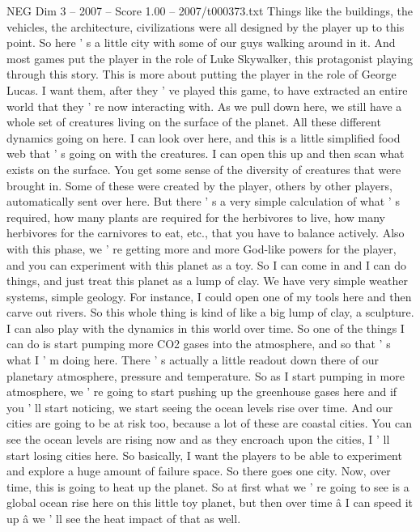 \begin{textsample}{NEG Dim 3 – 2007 – Score 1.00 – 2007/t000373.txt}
Things like the buildings, the vehicles, the architecture, civilizations were all designed by the player up to this point.
So here ' s a little city with some of our guys walking around in it.
And most games put the player in the role of Luke Skywalker, this protagonist playing through this story.
This is more about putting the player in the role of George Lucas.
I want them, after they ' ve played this game, to have extracted an entire world that they ' re now interacting with.
As we pull down here, we still have a whole set of creatures living on the surface of the planet.
All these different dynamics going on here.
I can look over here, and this is a little simplified food web that ' s going on with the creatures.
I can open this up and then scan what exists on the surface.
You get some sense of the diversity of creatures that were brought in.
Some of these were created by the player, others by other players, automatically sent over here.
But there ' s a very simple calculation of what ' s required, how many plants are required for the herbivores to live, how many herbivores for the carnivores to eat, etc., that you have to balance actively.
Also with this phase, we ' re getting more and more God-like powers for the player, and you can experiment with this planet as a toy.
So I can come in and I can do things, and just treat this planet as a lump of clay.
We have very simple weather systems, simple geology.
For instance, I could open one of my tools here and then carve out rivers.
So this whole thing is kind of like a big lump of clay, a sculpture.
I can also play with the dynamics in this world over time.
So one of the things I can do is start pumping more CO2 gases into the atmosphere, and so that ' s what I ' m doing here.
There ' s actually a little readout down there of our planetary atmosphere, pressure and temperature.
So as I start pumping in more atmosphere, we ' re going to start pushing up the greenhouse gases here and if you ' ll start noticing, we start seeing the ocean levels rise over time.
And our cities are going to be at risk too, because a lot of these are coastal cities.
You can see the ocean levels are rising now and as they encroach upon the cities, I ' ll start losing cities here.
So basically, I want the players to be able to experiment and explore a huge amount of failure space.
So there goes one city.
Now, over time, this is going to heat up the planet.
So at first what we ' re going to see is a global ocean rise here on this little toy planet, but then over time â I can speed it up â we ' ll see the heat impact of that as well.

\end{textsample}
